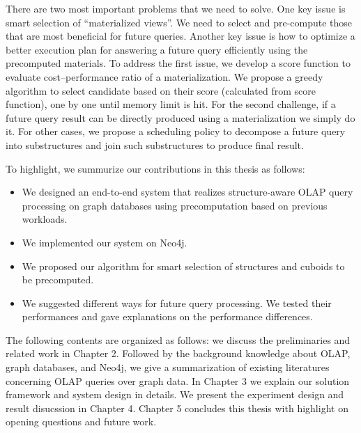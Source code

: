 
There are two most important problems that we need to solve. One key issue is smart selection of ``materialized views''. We need to select and pre-compute those that are most beneficial for future queries. Another key issue is how to optimize a better execution plan for answering a future query efficiently using the precomputed materials.
To address the first issue, we develop a score function to evaluate cost–performance ratio of a materialization. We propose a greedy  algorithm to  select candidate  based on their score (calculated from score function), one by one until memory limit is hit. For the second challenge, if a future query result can be directly produced using a materialization we simply do it. For other cases, we propose a scheduling policy to decompose a future query into substructures and join such substructures to produce final result.

To highlight, we summurize our contributions in this thesis as follows:
\begin{itemize}
\item {We designed an end-to-end system that realizes structure-aware OLAP query processing on graph databases using precomputation based on previous workloads.}

\item We implemented our system on Neo4j.

\item We proposed our algorithm for smart selection of structures and cuboids to be precomputed.

\item We suggested different ways for future query processing. We tested their performances and gave explanations on the performance differences.

 \end{itemize}

The following contents are organized as follows:
 we discuss the preliminaries and related work in Chapter 2. Followed by the background knowledge about  OLAP, graph databases, and Neo4j, we give a summarization of existing literatures concerning OLAP queries over graph data. In Chapter 3 we explain our solution framework and system design in details. We present the experiment design and result disucssion in Chapter 4. Chapter 5 concludes this thesis with highlight on opening questions and future work.

